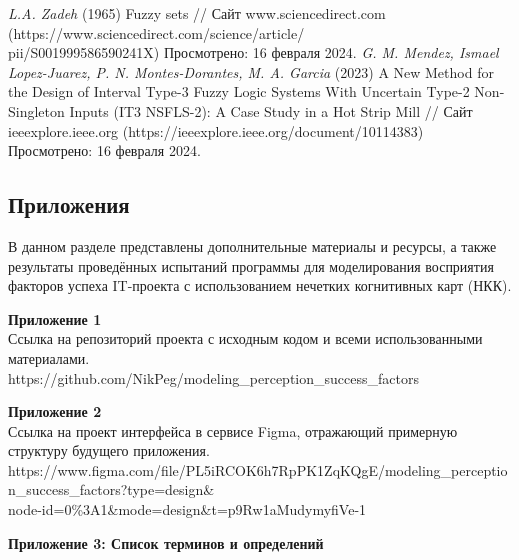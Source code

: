 \documentclass{article}
\newcommand\zz[1]{\par{\normalsize\strut #1} \hfill\ignorespaces}
\begin{document}
\begin{itemize}
\begin{thebibliography}{}
         \textit{L.A. Zadeh} (1965) Fuzzy sets // Сайт www.sciencedirect.com (https://www.sciencedirect.com/science/article/\\pii/S001999586590241X) Просмотрено: 16 февраля 2024.
         \textit{G. M. Mendez, Ismael Lopez-Juarez, P. N. Montes-Dorantes, M. A. Garcia} (2023) A New Method for the Design of Interval Type-3 Fuzzy Logic Systems With Uncertain Type-2 Non-Singleton Inputs (IT3 NSFLS-2): A Case Study in a Hot Strip Mill // Сайт ieeexplore.ieee.org (https://ieeexplore.ieee.org/document/10114383) Просмотрено: 16 февраля 2024.
    \end{thebibliography}
    \newpage
    \begin{center}
        \section*{Приложения}
    \end{center}
    В данном разделе представлены дополнительные материалы и ресурсы, а также результаты проведённых испытаний программы для моделирования восприятия факторов успеха IT-проекта с использованием нечетких когнитивных карт (НКК).

    \zz{}\textbf{Приложение 1\\}
    Ссылка на репозиторий проекта с исходным кодом и всеми использованными материалами.\\
    https://github.com/NikPeg/modeling\_perception\_success\_factors\\
    \zz{}\textbf{Приложение 2\\}
    Ссылка на проект интерфейса в сервисе Figma, отражающий примерную структуру будущего приложения.\\
    https://www.figma.com/file/PL5iRCOK6h7RpPK1ZqKQgE/modeling\_perception\_success\_factors?type=design\&\\node-id=0\%3A1&mode=design&t=p9Rw1aMudymyfiVe-1\\

    \zz{}\textbf{Приложение 3: Список терминов и определений}


\end{itemize}
\end{document}
